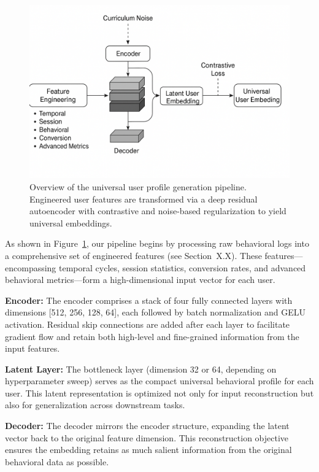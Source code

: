 \documentclass[sigconf]{acmart}
\begin{document}
\begin{figure}[t]
  \centering
  \includegraphics[width=0.9\linewidth]{autoencoder_pipeline_diagram.png}
  \caption{Overview of the universal user profile generation pipeline. Engineered user features are transformed via a deep residual autoencoder with contrastive and noise-based regularization to yield universal embeddings.}
  \label{fig:architecture}
\end{figure}

As shown in Figure~\ref{fig:architecture}, our pipeline begins by processing raw behavioral logs into a comprehensive set of engineered features (see Section~X.X). These features—encompassing temporal cycles, session statistics, conversion rates, and advanced behavioral metrics—form a high-dimensional input vector for each user.

\textbf{Encoder:}  
The encoder comprises a stack of four fully connected layers with dimensions [512, 256, 128, 64], each followed by batch normalization and GELU activation. Residual skip connections are added after each layer to facilitate gradient flow and retain both high-level and fine-grained information from the input features.

\textbf{Latent Layer:}  
The bottleneck layer (dimension 32 or 64, depending on hyperparameter sweep) serves as the compact universal behavioral profile for each user. This latent representation is optimized not only for input reconstruction but also for generalization across downstream tasks.

\textbf{Decoder:}  
The decoder mirrors the encoder structure, expanding the latent vector back to the original feature dimension. This reconstruction objective ensures the embedding retains as much salient information from the original behavioral data as possible.
\end{document}
